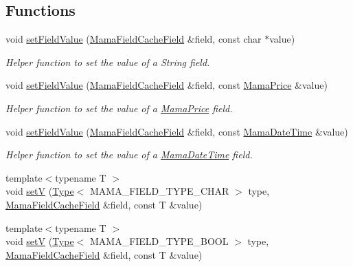 \subsection*{Functions}
\begin{DoxyCompactItemize}
\item 
void \hyperlink{namespaceWombat_a81e7cf2ec14814be5498bbee127e8d0f}{setFieldValue} (\hyperlink{classWombat_1_1MamaFieldCacheField}{MamaFieldCacheField} \&field, const char $\ast$value)
\begin{DoxyCompactList}\small\item\em Helper function to set the value of a String field. \item\end{DoxyCompactList}\item 
void \hyperlink{namespaceWombat_a391c59fa23a46139a567cfe06830c2bd}{setFieldValue} (\hyperlink{classWombat_1_1MamaFieldCacheField}{MamaFieldCacheField} \&field, const \hyperlink{classWombat_1_1MamaPrice}{MamaPrice} \&value)
\begin{DoxyCompactList}\small\item\em Helper function to set the value of a \hyperlink{classWombat_1_1MamaPrice}{MamaPrice} field. \item\end{DoxyCompactList}\item 
void \hyperlink{namespaceWombat_ad857c5a06585509bf1831bbc332c09de}{setFieldValue} (\hyperlink{classWombat_1_1MamaFieldCacheField}{MamaFieldCacheField} \&field, const \hyperlink{classWombat_1_1MamaDateTime}{MamaDateTime} \&value)
\begin{DoxyCompactList}\small\item\em Helper function to set the value of a \hyperlink{classWombat_1_1MamaDateTime}{MamaDateTime} field. \item\end{DoxyCompactList}\item 
{\footnotesize template$<$typename T $>$ }\\void \hyperlink{namespaceWombat_a2ae8b3003aa5519b6dfac49381383dc2}{setV} (\hyperlink{classWombat_1_1Type}{Type}$<$ MAMA\_\-FIELD\_\-TYPE\_\-CHAR $>$ type, \hyperlink{classWombat_1_1MamaFieldCacheField}{MamaFieldCacheField} \&field, const T \&value)
\item 
{\footnotesize template$<$typename T $>$ }\\void \hyperlink{namespaceWombat_a676926737581099bd044cab9a2659027}{setV} (\hyperlink{classWombat_1_1Type}{Type}$<$ MAMA\_\-FIELD\_\-TYPE\_\-BOOL $>$ type, \hyperlink{classWombat_1_1MamaFieldCacheField}{MamaFieldCacheField} \&field, const T \&value)

\end{DoxyCompactItemize}
